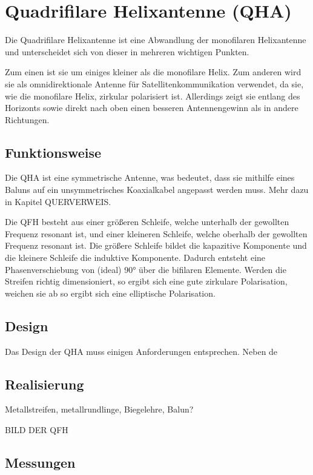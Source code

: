 \chapter{Quadrifilare Helixantenne (QHA)}
\label{chap:qfh}
Die Quadrifilare Helixantenne ist eine Abwandlung der monofilaren Helixantenne und unterscheidet sich von dieser in mehreren wichtigen Punkten.

Zum einen ist sie um einiges kleiner als die monofilare Helix. Zum anderen wird sie als omnidirektionale Antenne für Satellitenkommunikation verwendet, da sie, wie die monofilare Helix, zirkular polarisiert ist. Allerdings zeigt sie entlang des Horizonts sowie direkt nach oben einen besseren Antennengewinn als in andere Richtungen.

\section{Funktionsweise}
Die QHA ist eine symmetrische Antenne, was bedeutet, dass sie mithilfe eines Baluns auf ein unsymmetrisches Koaxialkabel angepasst werden muss. Mehr dazu in Kapitel QUERVERWEIS.

Die QFH besteht aus einer größeren Schleife, welche unterhalb der gewollten Frequenz resonant ist, und einer kleineren Schleife, welche oberhalb der gewollten Frequenz resonant ist. Die größere Schleife bildet die kapazitive Komponente und die kleinere Schleife die induktive Komponente. Dadurch entsteht eine Phasenverschiebung von (ideal) 90° über die bifilaren Elemente. Werden die Streifen richtig dimensioniert, so ergibt sich eine gute zirkulare Polarisation, weichen sie ab so ergibt sich eine elliptische Polarisation.

\section{Design}
Das Design der QHA muss einigen Anforderungen entsprechen. Neben de

\section{Realisierung}
Metallstreifen, metallrundlinge, Biegelehre, Balun?

BILD DER QFH

\section{Messungen}

